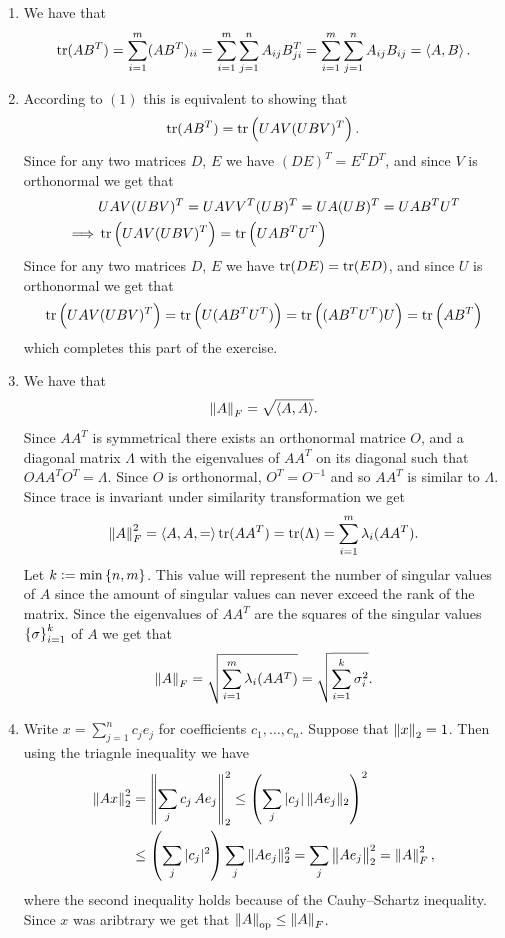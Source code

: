 \documentclass[11pt, a4paper]{article}
\begin{document}
\begin{solution} \phantom{}
\begin{enumerate}
  \item[(1)] We have that
    \[
      \operatorname{tr}(A B^T) =
      \sum_{i=1}^{m} (A B^T)_{ii} =
      \sum_{i=1}^{m} \sum_{j=1}^{n} A_{ij} B^T_{ji} =
      \sum_{i=1}^{m} \sum_{j=1}^{n} A_{ij} B_{ij} =
      \left\langle A, B \right\rangle.
    \]
  \item[(2)] According to $(1)$ this is equivalent to showing that
    \[
      \tr(A B^T) =
      \tr\del{U A V (U B V)^T}.
    \]
    Since for any two matrices $D$, $E$ we have $(DE)^T = E^T D^T$, and since
    $V$ is orthonormal we get that
    \begin{align*}
      &U A V (U B V)^T =
      U A V V^T (U B)^T =
      U A (U B)^T =
      U A B^T U^T
      \\ \implies
      &\tr\del{U A V (U B V)^T} =
      \tr\del{U A B^T U^T}
    \end{align*}
    Since for any two matrices $D$, $E$ we have $\operatorname{tr}(DE) = \operatorname{tr}(ED)$,
    and since $U$ is orthonormal we get that
    \[
      \tr\del{U A V (U B V)^T} =
      \tr\del{U (A B^T U^T)} =
      \tr\del{(A B^T U^T) U} =
      \tr\del{A B^T}
    \]
    which completes this part of the exercise.
  \item[(3)] We have that
    \[
      \left\lVert A\right\rVert_{F} = \sqrt{\left\langle A, A \right\rangle}.
    \]
    Since $A A^T$ is symmetrical
    there exists an orthonormal matrice $O$,
    and a diagonal matrix $\Lambda$ with the eigenvalues of $A A^T$
    on its diagonal
    such that $O A A^T O^T = \Lambda$.
    Since $O$ is orthonormal, $O^T = O^{-1}$ and so $A A^T$ is similar
    to $\Lambda$.
    Since trace is invariant under similarity transformation we get
    \[
      \left\lVert A\right\rVert_{F}^{2} =
      \left\langle A,A, = \right\rangle
      \operatorname{tr}(A A^T) =
      \operatorname{tr}(\Lambda) =
      \sum_{i=1}^{m}{\lambda_{i}(A A^T)}.
    \]
    Let $k := \min\left\{n,m\right\}$.
    This value will represent the number of singular values of $A$ since
    the amount of singular values can never exceed the rank of the matrix.
    Since the eigenvalues of $A A^T$ are the squares of the
    singular values $\left\{\sigma\right\}_{i=1}^{k}$ of $A$ we get that
    \[
      \left\lVert A\right\rVert_{F} =
      \sqrt{\sum_{i=1}^{m}{\lambda_{i}(A A^T)}} =
      \sqrt{\sum_{i=1}^{k}{\sigma_{i}^{2}}}.
    \]
  \item[(4)] Write $x=\sum_{j=1}^nc_je_j$ for coefficients $c_1,\dots,c_n$.
    Suppose that $\left\lVert x\right\rVert_2 = 1$.
    Then using the triagnle inequality we have
    \begin{align*}
      \norm{Ax}_2^2 &= 
      \norm{\sum_j c_j\,Ae_j}_2^2 \leq
      \del{\sum_j|c_j|\,\|Ae_j\|_2}^{2} \\ 
                    &\leq\del{\sum_j|c_j|^2} \sum_j \|Ae_j\|_2^2 = 
                    \sum_j \norm{Ae_j}_2^2 = \norm{A}_F^2,
    \end{align*}
    where the second inequality holds because of the Cauhy--Schartz inequality.
    Since $x$ was aribtrary we get that $\left\lVert A\right\rVert_{\operatorname{op}} \le \left\lVert A\right\rVert_{F}$.


\end{enumerate}
\end{solution}
\end{document}
